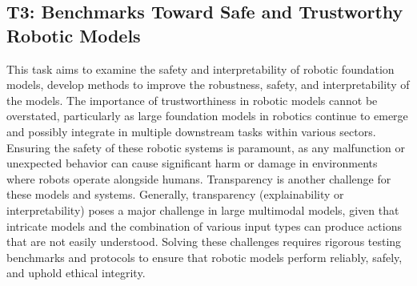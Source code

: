  


\subsection{T3: Benchmarks Toward Safe and Trustworthy Robotic Models} \label{sec:t3}
This task aims to examine the safety and interpretability of robotic foundation models, develop methods to improve the robustness, safety, and interpretability of the models.
The importance of trustworthiness in robotic models cannot be overstated, particularly as large foundation models in robotics continue to emerge and possibly integrate in multiple downstream tasks within various sectors. 
Ensuring the safety of these robotic systems is paramount, as any malfunction or unexpected behavior can cause significant harm or damage in environments where robots operate alongside humans. 
Transparency is another challenge for these models and systems.
Generally, transparency (\ie explainability or interpretability) poses a major challenge in large multimodal models, given that intricate models and the combination of various input types can produce actions that are not easily understood.
Solving these challenges requires rigorous testing benchmarks and protocols to ensure that robotic models perform reliably, safely, and uphold ethical integrity.



